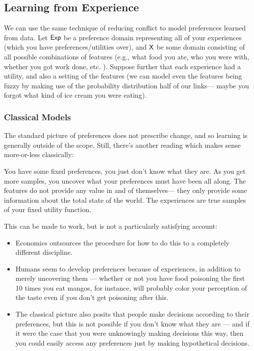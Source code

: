 \documentclass{article}
\begin{document}
	
	\subsection{Learning from Experience}
	
	
	We can use the same technique of reducing conflict to model preferences learned from data. Let $\sf Exp$ be a preference domain representing all of your experiences (which you have preferences/utilities over), and $\sf X$ be some domain consisting of all possible combinations of features (e.g., what food you ate, who you were with, whether you got work done, etc. ). Suppose further that each experience had a utility, and also a setting of the features (we can model even the features being fuzzy by making use of the probability distribution half of our links--- maybe you forgot what kind of ice cream you were eating). 
	
	\subsubsection{Classical Models}
	The standard picture of preferences does not prescribe change, and so learning is generally outside of the scope. Still, there's another reading which makes sense more-or-less classically:
	
	You have some fixed preferences, you just don't know what they are. As you get more samples, you uncover what your preferences must have been all along. The features do not provide any value in and of themselves--- they only provide some information about the total state of the world. The experiences are true samples of your fixed utility function. 
	
	This can be made to work, but is not a particularly satisfying account:
	\begin{itemize}[nosep]
		\item Economics outsources the procedure for how to do this to a completely different discipline.
		\item Humans seem to develop preferences because of experiences, in addition to merely uncovering them --- whether or not you have food poisoning the first 10 times you eat mangos, for instance, will probably color your perception of the taste even if you don't get poisoning after this.
		\item The classical picture also posits that people make decisions according to their preferences, but this is not possible if you don't know what they are --- and if it were the case that you were unknowingly making decisions this way, then you could easily access any preferences just by making hypothetical decisions.
	\end{itemize}
	
\end{document}
